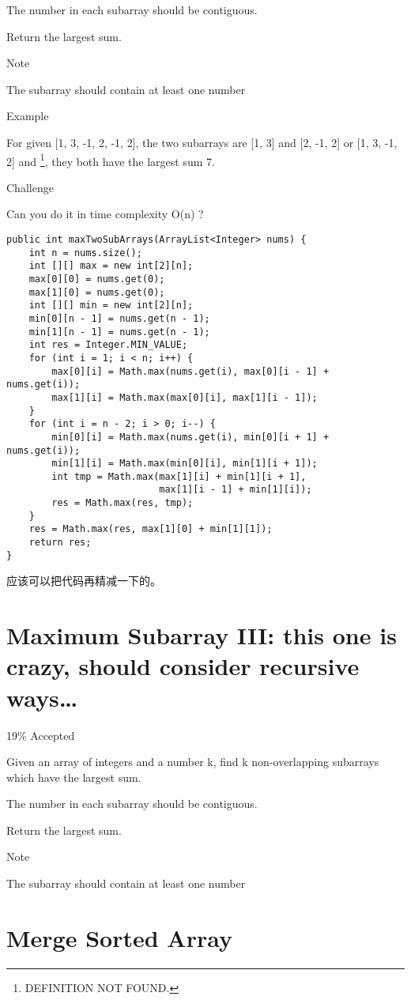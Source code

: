 \documentclass[9pt, b5paaper]{book}
\begin{document}
The number in each subarray should be contiguous.

Return the largest sum.

Note

The subarray should contain at least one number

Example

For given [1, 3, -1, 2, -1, 2], the two subarrays are [1, 3] and [2, -1, 2] or [1, 3, -1, 2] and \footnote{DEFINITION NOT FOUND.}, they both have the largest sum 7.

Challenge

Can you do it in time complexity O(n) ?
\begin{verbatim}
public int maxTwoSubArrays(ArrayList<Integer> nums) {
    int n = nums.size();
    int [][] max = new int[2][n];
    max[0][0] = nums.get(0);
    max[1][0] = nums.get(0);
    int [][] min = new int[2][n];
    min[0][n - 1] = nums.get(n - 1); 
    min[1][n - 1] = nums.get(n - 1);
    int res = Integer.MIN_VALUE;
    for (int i = 1; i < n; i++) {
        max[0][i] = Math.max(nums.get(i), max[0][i - 1] + nums.get(i));
        max[1][i] = Math.max(max[0][i], max[1][i - 1]);
    }
    for (int i = n - 2; i > 0; i--) {
        min[0][i] = Math.max(nums.get(i), min[0][i + 1] + nums.get(i));
        min[1][i] = Math.max(min[0][i], min[1][i + 1]);
        int tmp = Math.max(max[1][i] + min[1][i + 1],
                           max[1][i - 1] + min[1][i]);
        res = Math.max(res, tmp);
    }
    res = Math.max(res, max[1][0] + min[1][1]);
    return res;
}
\end{verbatim}

应该可以把代码再精减一下的。
\section{Maximum Subarray III: this one is crazy, should consider recursive ways\ldots{}}
\label{sec-5-42}

19\% Accepted

Given an array of integers and a number k, find k non-overlapping subarrays which have the largest sum.

The number in each subarray should be contiguous.

Return the largest sum.

Note

The subarray should contain at least one number
\section{Merge Sorted Array}
\label{sec-5-43}
\end{document}
